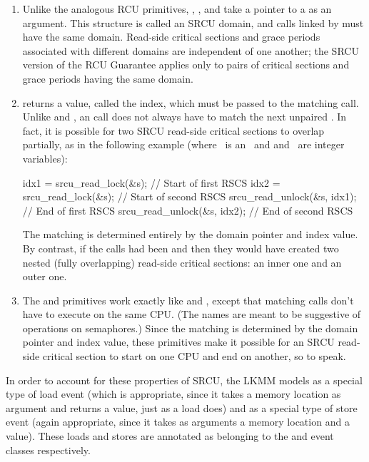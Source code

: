 \begin{enumerate}
\item	Unlike the analogous RCU primitives, ,
	, and  take a pointer to a
	 as an argument.
	This structure is called
	an SRCU domain, and calls linked by  must have the
	same domain.
	Read-side critical sections and grace periods
	associated with different domains are independent of one
	another; the SRCU version of the RCU Guarantee applies only
	to pairs of critical sections and grace periods having the
	same domain.

\item	{} returns a value, called the index, which must
	be passed to the matching  call.
	Unlike
	 and , an 
	call does not always have to match the next unpaired
	.
	In fact, it is possible for two SRCU
	read-side critical sections to overlap partially, as in the
	following example (where ~is an~
	and  and~
	are integer variables):

\begin{VerbatimU}
		idx1 = srcu_read_lock(&s);       // Start of first RSCS
		idx2 = srcu_read_lock(&s);       // Start of second RSCS
		srcu_read_unlock(&s, idx1);      // End of first RSCS
		srcu_read_unlock(&s, idx2);      // End of second RSCS
\end{VerbatimU}

	The matching is determined entirely by the domain pointer and
	index value.
	By contrast, if the calls had been
	 and  then they would have
	created two nested (fully overlapping) read-side critical
	sections{:} an inner one and an outer one.

\item	The  and  primitives work
	exactly like  and , except
	that matching calls don't have to execute on the same CPU\@.
	(The names are meant to be suggestive of operations on
	semaphores.)
	Since the matching is determined by the domain
	pointer and index value, these primitives make it possible for
	an SRCU read-side critical section to start on one CPU and end
	on another, so to speak.
\end{enumerate}

In order to account for these properties of SRCU, the LKMM models
 as a special type of load event (which is
appropriate, since it takes a memory location as argument and returns
a value, just as a load does) and  as a special type
of store event (again appropriate, since it takes as arguments a
memory location and a value).
These loads and stores are annotated as
belonging to the  and  event classes
respectively.

